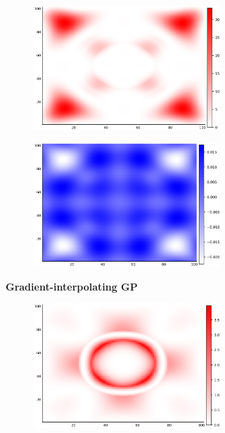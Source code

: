 \documentclass{article}
\begin{document}
\begin{figure}
\begin{subfigure}[b]{.5\textwidth}
\begin{subfigure}[b]{.5\textwidth}
        \includegraphics[scale=0.27]{figures/heatmaps/error-der-25.png}
      \end{subfigure}%
      \begin{subfigure}[b]{.5\textwidth}
        \centering
        \includegraphics[scale=0.27]{figures/heatmaps/variance-der-25.png}
      \end{subfigure}
      \caption{\textbf{Gradient-interpolating GP}}
    \end{subfigure}
    \begin{subfigure}[b]{.5\textwidth}
      \centering
      \begin{subfigure}[b]{.5\textwidth}
        \centering
        \includegraphics[scale=0.27]{figures/heatmaps/error-noisy-25.png}

\end{subfigure}
\end{subfigure}
\end{figure}
\end{document}
